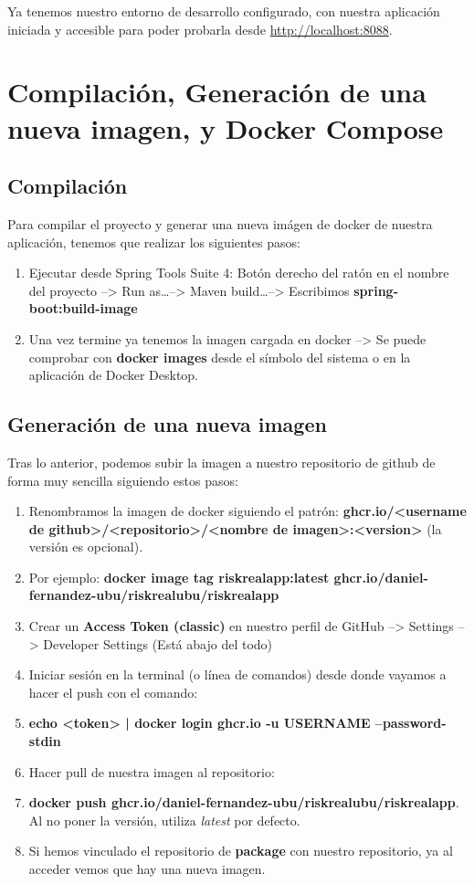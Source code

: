 

Ya tenemos nuestro entorno de desarrollo configurado, con nuestra aplicación iniciada y accesible para poder probarla desde \url{http://localhost:8088}.

\section{Compilación, Generación de una nueva imagen, y Docker Compose}

\subsection{Compilación}

Para compilar el proyecto y generar una nueva imágen de docker de nuestra aplicación, tenemos que realizar los siguientes pasos:

\begin{enumerate}
	\item Ejecutar desde Spring Tools Suite 4: Botón derecho del ratón en el nombre del proyecto --> Run as\dots --> Maven build\dots --> Escribimos \textbf{spring-boot:build-image}
	\item Una vez termine ya tenemos la imagen cargada en docker --> Se puede comprobar con \textbf{docker images} desde el símbolo del sistema o en la aplicación de Docker Desktop.
\end{enumerate}

\subsection{Generación de una nueva imagen}

Tras lo anterior, podemos subir la imagen a nuestro repositorio de github de forma muy sencilla siguiendo estos pasos:

\begin{enumerate}
	\item Renombramos la imagen de docker siguiendo el patrón: \textbf{ghcr.io/<username de github>/<repositorio>/<nombre de imagen>:<version>} (la versión es opcional).
 	\item Por ejemplo: \textbf{docker image tag riskrealapp:latest ghcr.io/daniel-fernandez-ubu/riskrealubu/riskrealapp}
 	\item Crear un \textbf{Access Token (classic)} en nuestro perfil de GitHub --> Settings --> Developer Settings (Está abajo del todo)
 	\item Iniciar sesión en la terminal (o línea de comandos) desde donde vayamos a hacer el push con el comando:
 	\item \textbf{echo <token> | docker login ghcr.io -u USERNAME --password-stdin}
 	\item Hacer pull de nuestra imagen al repositorio:
 	\item \textbf{docker push ghcr.io/daniel-fernandez-ubu/riskrealubu/riskrealapp}. Al no poner la versión, utiliza \textit{latest} por defecto.
	\item Si hemos vinculado el repositorio de \textbf{package} con nuestro repositorio, ya al acceder vemos que hay una nueva imagen.
\end{enumerate}

